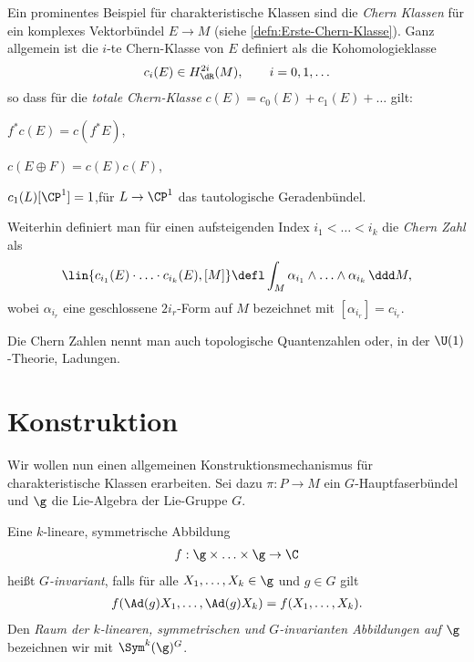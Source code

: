 \documentclass[%
	paper=a5,%
	fleqn,%
	DIV=18,%
	BCOR=0mm,
	fontsize=11pt,
	titlepage=false,%
	bibliography=totoc,
	DIV=18,%
	twoside=true,
	pdftitle=Riemannsche Geometrie,
	pdfauthor=Uwe Semmelmann,
	numbers=noendperiod]%
	{scrbook}
\begin{document}
\begin{ex}
Ein prominentes Beispiel für charakteristische Klassen sind die \emph{Chern
Klassen} für ein komplexes Vektorbündel $E\to M$ (siehe
\ref{defn:Erste-Chern-Klasse}). Ganz allgemein ist die $i$-te
Chern-Klasse von $E$ definiert als die Kohomologieklasse
\begin{align*}
c_i(E)\in H_\dR^{2i}(M),\qquad i =0,1,\ldots 
\end{align*}
so dass für die \emph{totale Chern-Klasse} $c(E) = c_0(E) + c_1(E) + \ldots$
gilt:
\begin{defnenum}
\item $f^*c(E) = c(f^*E)$,
\item $c(E\oplus F) = c(E)c(F)$,
\item $c_1(L) [\CP^1] = 1$,\quad für $L\to \CP^1$ das tautologische
Geradenbündel.
\end{defnenum}

Weiterhin definiert man für einen aufsteigenden Index $i_1 < \ldots < i_k$
die \emph{Chern Zahl} als
\begin{align*}
\lin{c_{i_1}(E)\cdot \ldots \cdot c_{i_k}(E),[M]}
\defl
\int_M \alpha_{i_1}\wedge \ldots \wedge \alpha_{i_k}\, \ddd M,
\end{align*}
wobei $\alpha_{i_r}$ eine geschlossene $2i_r$-Form auf $M$ bezeichnet mit
$[\alpha_{i_r}] = c_{i_r}$.

Die Chern Zahlen nennt man auch topologische Quantenzahlen oder, in der
$\U(1)$-Theorie, Ladungen.\boxc
\end{ex}

\section{Konstruktion}

Wir wollen nun einen allgemeinen Konstruktionsmechanismus für charakteristische
Klassen erarbeiten. Sei dazu $\pi: P\to M$ ein $G$-Hauptfaserbündel und $\g$ die
Lie-Algebra der Lie-Gruppe $G$.

\begin{defn}
Eine $k$-lineare, symmetrische Abbildung
\begin{align*}
f : \g\times \ldots \times \g \to \C
\end{align*}
heißt \emph{$G$-invariant}, falls für alle $X_1,\ldots,X_k\in \g$ und $g\in G$
gilt
\begin{align*}
f(\Ad(g)X_1,\ldots,\Ad(g)X_k) = f(X_1,\ldots,X_k).
\end{align*}
Den \emph{Raum der $k$-linearen, symmetrischen und $G$-invarianten Abbildungen
auf $\g$} bezeichnen wir mit \emph{$\Sym^k(\g)^G$}.\fish
\end{defn}
\end{document}
